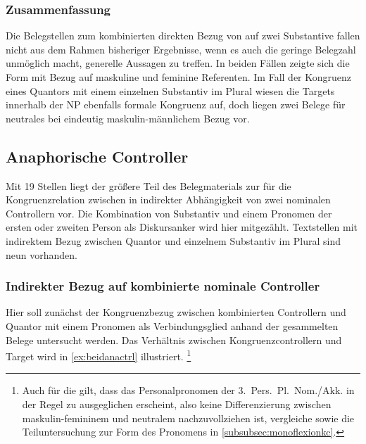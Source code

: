 \subsubsection{Zusammenfassung}

Die Belegstellen zum kombinierten direkten Bezug von \mbox{} auf
zwei Substantive fallen nicht aus dem Rahmen bisheriger Ergebnisse, wenn es
auch die geringe Belegzahl unmöglich macht, generelle Aussagen zu treffen. In
beiden Fällen zeigte sich die Form  mit Bezug auf maskuline und
feminine Referenten. Im Fall der Kongruenz eines Quantors mit einem einzelnen
Substantiv im Plural wiesen die Targets innerhalb der NP ebenfalls formale
Kongruenz auf, doch liegen zwei Belege für neutrales  bei
eindeutig maskulin-männlichem Bezug vor.

\subsection{Anaphorische Controller}

Mit 19 Stellen liegt der größere Teil des Belegmaterials zur \KC{} für die
Kongruenzrelation zwischen  in indirekter Abhängigkeit von zwei
nominalen Controllern vor. Die Kombination von Substantiv und einem Pronomen
der ersten oder zweiten Person als Diskurs\-anker wird hier mitgezählt.
Textstellen mit indirektem Bezug zwischen Quantor und einzelnem Substantiv im
Plural sind neun vorhanden.

\subsubsection{Indirekter Bezug auf kombinierte nominale Controller}
\label{subsubssec:iconomctrlpers}

Hier soll zunächst der Kongruenzbezug zwischen kombinierten Controllern und
Quantor mit einem Pronomen als Verbindungsglied anhand der gesammelten Belege
untersucht werden.
Das Verhältnis zwischen Kongruenzcontrollern und Target wird in
\cref{ex:beidanactrl} illustriert.%
%
	\footnote{Auch für die \KC{} gilt, dass das Personalpronomen der
		3.~Pers.\ Pl.\ Nom./Akk. in der Regel zu  ausgeglichen
		erscheint, also keine Differenzierung zwischen maskulin-femininem
		 und neutralem  nachzuvollziehen ist, vergleiche
		\textcites[213--214]{paul2007}[369, 390--397]{ksw2} sowie die
		Teiluntersuchung zur Form des Pronomens in
		\cref{subsubsec:monoflexionkc}.}

